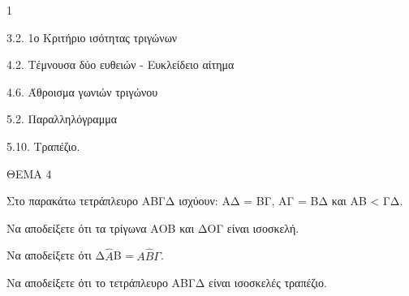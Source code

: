 \begin{ylh}{1}
    \item 3.2. 1ο Κριτήριο ισότητας τριγώνων
    \item 4.2. Τέμνουσα δύο ευθειών - Ευκλείδειο αίτημα
    \item 4.6. Άθροισμα γωνιών τριγώνου
    \item 5.2. Παραλληλόγραμμα
    \item 5.10. Τραπέζιο.
\end{ylh}

ΘΕΜΑ 4

Στο παρακάτω τετράπλευρο ΑΒΓΔ ισχύουν: ΑΔ = ΒΓ, ΑΓ = ΒΔ και ΑΒ \textless{} ΓΔ.

\begin{alist}
\item Να αποδείξετε ότι τα τρίγωνα ΑΟΒ και ΔΟΓ είναι ισοσκελή. 

\item Να αποδείξετε ότι Δ$\widehat{Α}$B =$\ Α\widehat{Β}\Gamma$. 

\item Να αποδείξετε ότι το τετράπλευρο ΑΒΓΔ είναι ισοσκελές τραπέζιο. 


\end{alist}
